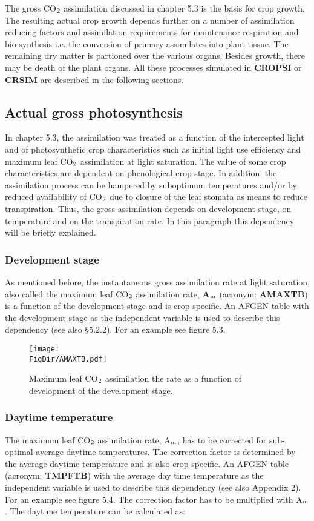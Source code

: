 The gross CO$_{{\rm 2}}$ assimilation discussed in chapter 5.3 is the basis for crop growth. The
resulting actual crop growth depends further on a number of assimilation reducing factors
and assimilation requirements for maintenance respiration and bio-synthesis i.e. the
conversion of primary assimilates into plant tissue. The remaining dry matter is partioned
over the various organs. Besides growth, there may be death of the plant organs. All
these processes simulated in {\bf CROPSI} or {\bf CRSIM} are described in the following sections.

\subsection{Actual gross photosynthesis}

In chapter 5.3, the assimilation was treated as a function of the intercepted light and of
photosynthetic crop characteristics such as initial light use efficiency and maximum leaf
CO$_{{\rm 2}}$ assimilation at light saturation. The value of some crop characteristics are dependent
on phenological crop stage. In addition, the assimilation process can be hampered by
suboptimum temperatures and/or by reduced availability of CO$_{{\rm 2}}$ due to closure of the leaf
stomata as means to reduce transpiration. Thus, the gross assimilation depends on
development stage, on temperature and on the transpiration rate. In this paragraph this
dependency will be briefly explained.

\subsubsection{Development stage}
As mentioned before, the instantaneous gross assimilation rate at light saturation, also
called the maximum leaf CO$_{{\rm 2}}$ assimilation rate, {\bf A$_{{\rm m}}$} (acronym: {\bf AMAXTB}) is a function of
the development stage and is crop specific. An AFGEN table with the development stage
as the independent variable is used to describe this dependency (see also \S 5.2.2). For an
example see figure 5.3.

\begin{figure}[p]
\centering
\texttt{[image: \\FigDir/AMAXTB.pdf]}
\caption{Maximum leaf CO$_{{\rm 2}}$ assimilation the rate as a function of development of
the development stage.}
\end{figure}

\subsubsection{Daytime temperature}
The maximum leaf CO$_{{\rm 2}}$ assimilation rate, A$_{{\rm m}}$, has to be corrected for sub-optimal average
daytime temperatures. The correction factor is determined by the average daytime
temperature and is also crop specific. An AFGEN table (acronym: {\bf TMPFTB}) with the
average day time temperature as the independent variable is used to describe this
dependency (see also Appendix 2). For an example see figure 5.4. 
The correction factor has to be multiplied with A$_{{\rm m}}$. The daytime temperature can be
calculated as:

